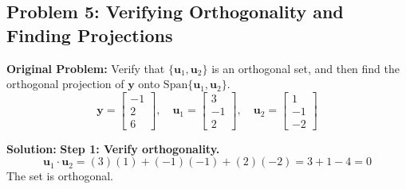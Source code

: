 \documentclass[11pt, letterpaper]{article}
\theoremstyle{definition}
\theoremstyle{remark}
\begin{document}
\subsection{Problem 5: Verifying Orthogonality and Finding Projections}
\textbf{Original Problem:} Verify that $\{\mathbf{u}_1, \mathbf{u}_2\}$ is an orthogonal set, and then find the orthogonal projection of $\mathbf{y}$ onto $\text{Span}\{\mathbf{u}_1, \mathbf{u}_2\}$.
\[ \mathbf{y} = \begin{bmatrix} -1 \\ 2 \\ 6 \end{bmatrix}, \quad \mathbf{u}_1 = \begin{bmatrix} 3 \\ -1 \\ 2 \end{bmatrix}, \quad \mathbf{u}_2 = \begin{bmatrix} 1 \\ -1 \\ -2 \end{bmatrix} \]

\textbf{Solution:}
\textbf{Step 1: Verify orthogonality.}
\[ \mathbf{u}_1 \cdot \mathbf{u}_2 = (3)(1) + (-1)(-1) + (2)(-2) = 3 + 1 - 4 = 0 \]
The set is orthogonal.
\end{document}
